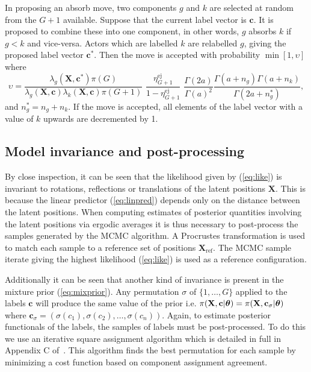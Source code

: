 \documentclass[12pt]{article}
\newcommand{\bX}{{\mathbf{X}}}
\newcommand{\bc}{{\mathbf{c}}}
\newcommand{\bftheta}{\hbox{\boldmath$\theta$}}
\begin{document}
In proposing an absorb move, two components $g$ and $k$ are selected at random from the $G+1$ available. Suppose that the current label vector is $\bc$. It is proposed to combine these into one component, in other words, $g$ absorbs $k$ if $g<k$ and vice-versa. Actors which are labelled $k$ are relabelled $g$, giving the proposed label vector $\bc^*$. Then the move is accepted with probability $\min[1,\upsilon]$ where
\[
\upsilon = \frac{ \lambda_g(\bX, \bc^*) \pi(G)}{\lambda_g(\bX,\bc)\lambda_k(\bX,\bc)\pi(G+1)} \,\,\frac{\eta_{G+1}^{\mathrm{ej}} }{ 1-\eta_{G+1}^{\mathrm{ej}} }\,\, \frac{\Gamma(2a)}{\Gamma(a)^2} \frac{\Gamma(a+n_g)\Gamma(a+n_k)}{\Gamma(2a + n_g^* )},
\]
and $n_g^* = n_g + n_k$. If the move is accepted, all elements of the label vector with a value of $k$ upwards are decremented by 1. 

\subsection{Model invariance and post-processing} \label{sec:invariance}

By close inspection, it can be seen that the likelihood given by (\ref{eq:like}) is invariant to rotations, reflections or translations of the latent positions $\bX$. This is because the linear predictor (\ref{eq:linpred}) depends only on the distance between the latent positions.  When computing estimates of posterior quantities involving the latent positions via ergodic averages it is thus necessary to post-process the samples generated by the MCMC algorithm. A Procrustes transformation \cite{sibson1978} is used to match each sample to a reference set of positions $\bX_{\mathrm{ref}}$. The MCMC sample iterate giving the highest likelihood (\ref{eq:like}) is used as a reference configuration.

Additionally it can be seen that another kind of invariance is present in the mixture prior (\ref{eq:mixprior}). Any permutation $\sigma$ of $\{1,\dots,G\}$  applied to the labels $\bc$ will produce the same value of the prior i.e. $\pi(\bX, \bc|\bftheta) = \pi(\bX,\bc_{\sigma}|\bftheta)$ where $\bc_\sigma = (\sigma(c_1),\sigma(c_2),\dots,\sigma(c_n))$. Again, to estimate posterior functionals of the labels, the samples of labels must be post-processed. To do this we use an iterative square assignment algorithm which is detailed in full in Appendix C of~. This algorithm finds the best permutation for each sample by minimizing a cost function based on component assignment agreement.
\end{document}
